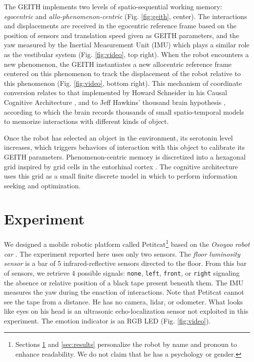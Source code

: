 \documentclass[runningheads]{llncs}
\begin{document}
The GEITH implements two levels of spatio-sequential working memory: \textit{egocentric} and \textit{allo-phenomenon-centric} (Fig. \ref{fig:geith}, center).  
The interactions and displacements are received in the egocentric reference frame based on the position of sensors and translation speed given as GEITH parameters, and the yaw measured by the Inertial Measurement Unit (IMU) which plays a similar role as the vestibular system %
(Fig. \ref{fig:video}, top right).
When the robot encounters a new phenomenon, the GEITH instantiates a new allocentric reference frame centered on this phenomenon to track the displacement of the robot relative to this phenomenon (Fig. \ref{fig:video}, bottom right). 
This mechanism of coordinate conversion relates to that implemented by Howard Schneider in his Causal Cognitive Architecture \cite{schneider_emergence_2024}, and to
Jeff Hawkins' thousand brain hypothesis \cite{hawkins_framework_2019}, according to which the brain records thousands of small spatio-temporal models to memorize interactions with different kinds of object.

Once the robot has selected an object in the environment, its serotonin level increases, which triggers behaviors of interaction with this object to calibrate its GEITH parameters. 
Phenomenon-centric memory is discretized into a hexagonal grid inspired by grid cells in the entorhinal cortex \cite{moser_place_2008}. 
The cognitive architecture uses this grid as a small finite discrete model in which to perform information seeking and optimization. %


\section{Experiment}
\label{sec:expe}

We designed a mobile robotic platform called Petitcat\footnote{Sections \ref{sec:expe} and \ref{sec:results} personalize the robot by name and pronoun to enhance readability. We do not claim that he has a psychology or gender.} based on the \textit{Osoyoo robot car} \cite{osoyoo_robot_car}.
The experiment reported here uses only two sensors.
The \textit{floor luminosity sensor} is a bar of 5 infrared-reflective sensors directed to the floor.
From this bar of sensors, we retrieve 4 possible signals:  \texttt{none},  \texttt{left},  \texttt{front}, or \texttt{right} signaling the absence or relative position of a black tape present beneath them.  
The IMU measures the yaw during the enaction of interactions.
Note that Petitcat cannot see the tape from a distance. 
He has no camera, lidar, or odometer.
What looks like eyes on his head is an ultrasonic echo-localization sensor not exploited in this experiment. 
The emotion indicator is an RGB LED (Fig. \ref{fig:video}). 
\end{document}
